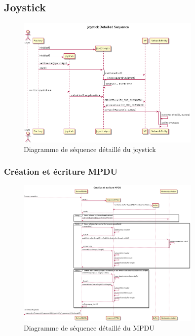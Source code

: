 \documentclass{report}
\begin{document}
\subsection{Joystick}
\begin{figure}[H]
    \centering
    \includegraphics[width= 0.8\textwidth]{Images/JoystickSequence.png}
    \caption{Diagramme de séquence détaillé du joystick}
    \label{fig:JoystickSequence}
\end{figure}
\subsubsection{Création et écriture MPDU}
\begin{figure}[H]
    \centering
    \includegraphics[width= 0.8\textwidth]{Images/multipdu.png}
    \caption{Diagramme de séquence détaillé du MPDU}
    \label{fig:MPDUSequence}
\end{figure}
\end{document}
